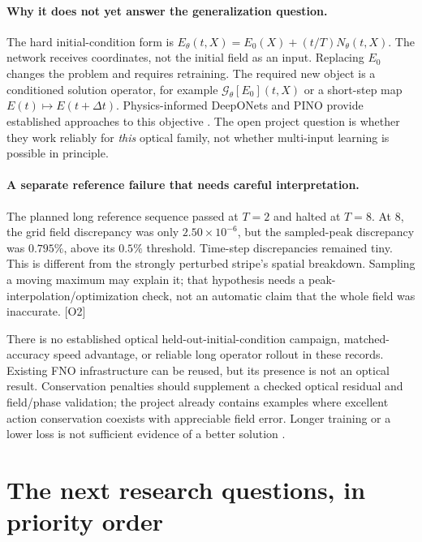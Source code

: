 \documentclass[11pt]{article}
\newcommand{\src}[1]{\textrm{[#1]}}
\begin{document}
\paragraph{Why it does not yet answer the generalization question.}
The hard initial-condition form is
$E_\theta(t,X)=E_0(X)+(t/T)N_\theta(t,X)$.
The network receives coordinates, not the initial field as an input. Replacing $E_0$ changes the problem and requires retraining. The required new object is a conditioned solution operator, for example
$\mathcal G_\theta[E_0](t,X)$ or a short-step map $E(t)\mapsto E(t+\Delta t)$.
Physics-informed DeepONets and PINO provide established approaches to this objective \cite{DeepONet,PINO}. The open project question is whether they work reliably for \emph{this} optical family, not whether multi-input learning is possible in principle.

\paragraph{A separate reference failure that needs careful interpretation.}
The planned long reference sequence passed at $T=2$ and halted at $T=8$. At $8$, the grid field discrepancy was only $2.50\times10^{-6}$, but the sampled-peak discrepancy was $0.795\%$, above its $0.5\%$ threshold. Time-step discrepancies remained tiny. This is different from the strongly perturbed stripe's spatial breakdown. Sampling a moving maximum may explain it; that hypothesis needs a peak-interpolation/optimization check, not an automatic claim that the whole field was inaccurate. \src{O2}

There is no established optical held-out-initial-condition campaign, matched-accuracy speed advantage, or reliable long operator rollout in these records. Existing FNO infrastructure can be reused, but its presence is not an optical result. Conservation penalties should supplement a checked optical residual and field/phase validation; the project already contains examples where excellent action conservation coexists with appreciable field error. Longer training or a lower loss is not sufficient evidence of a better solution \cite{PINNfail}.

\newpage
\section{The next research questions, in priority order}
\end{document}
